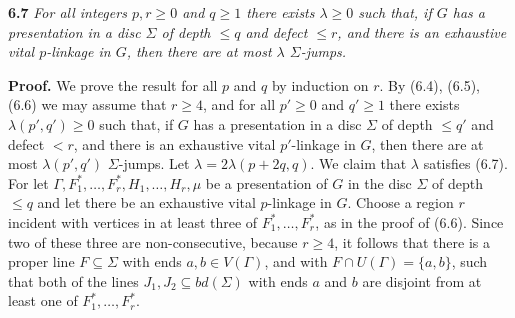 \textbf{6.7} \textit{For all integers $p, r \ge 0$ and $q \ge 1$ there exists $\lambda \ge 0$ such that, if $G$ has a presentation in a disc $\Sigma$ of depth $\le q$ and defect $\le r$, and there is an exhaustive vital $p$-linkage in $G$, then there are at most $\lambda$ $\Sigma$-jumps.}

\textbf{Proof.} We prove the result for all $p$ and $q$ by induction on $r$. By (6.4), (6.5), (6.6) we may assume that $r \ge 4$, and for all $p' \ge 0$ and $q' \ge 1$ there exists $\lambda(p', q') \ge 0$ such that, if $G$ has a presentation in a disc $\Sigma$ of depth $\le q'$ and defect $< r$, and there is an exhaustive vital $p'$-linkage in $G$, then there are at most $\lambda(p', q')$ $\Sigma$-jumps. Let $\lambda = 2\lambda(p + 2q, q)$. We claim that $\lambda$ satisfies (6.7). For let $\Gamma, F_1^*, \dots, F_r^*, H_1, \dots, H_r, \mu$ be a presentation of $G$ in the disc $\Sigma$ of depth $\le q$ and let there be an exhaustive vital $p$-linkage in $G$. Choose a region $r$ incident with vertices in at least three of $F_1^*, \dots, F_r^*$, as in the proof of (6.6). Since two of these three are non-consecutive, because $r \ge 4$, it follows that there is a proper line $F \subseteq \Sigma$ with ends $a, b \in V(\Gamma)$, and with $F \cap U(\Gamma) = \{a, b\}$, such that both of the lines $J_1, J_2 \subseteq bd(\Sigma)$ with ends $a$ and $b$ are disjoint from at least one of $F_1^*, \dots, F_r^*$.
